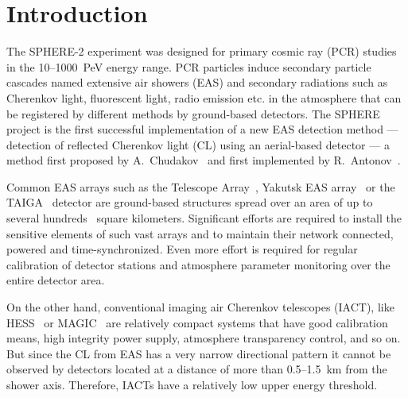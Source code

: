 \documentclass[universe,article,submit,moreauthors,pdftex]{Definitions/mdpi}
\begin{document}




\section{Introduction}
The SPHERE-2 experiment was designed for primary cosmic ray (PCR) studies in the 10--1000~PeV energy range. PCR particles induce secondary particle cascades named extensive air showers (EAS) and secondary radiations such as Cherenkov light, fluorescent light, radio emission etc. in the atmosphere that can be registered by different methods by ground-based detectors. 
The SPHERE project is the first successful implementation of a new EAS detection method --- detection of reflected Cherenkov light (CL) using an aerial-based detector --- a method first proposed by A.~Chudakov~\cite{chu74:VKKL74} and first implemented by R.~Antonov~\cite{ant75, ant86, ant97, Ant15a}.

Common EAS arrays such as the Telescope Array~\cite{abu12}, Yakutsk EAS array~\cite{Yakutsk19} or the TAIGA~\cite{TAIGA20} detector are ground-based structures spread over an area of up to several hundreds~\cite{abu12} square kilometers. Significant efforts are required to install the sensitive elements of such vast arrays and to maintain their network connected, powered and time-synchronized. Even more effort is required for regular calibration of detector stations and atmosphere parameter monitoring over the entire detector area. 

On the other hand, conventional imaging air Cherenkov telescopes (IACT), like HESS~\cite{HESS03a, HESS03b} or MAGIC~\cite{MAGIC16-1, MAGIC16-2} are relatively compact systems that have good calibration means, high integrity power supply, atmosphere transparency control, and so on. But since the CL from EAS has a very narrow directional pattern it cannot be observed by detectors located at a distance of more than 0.5--1.5~km from the shower axis. Therefore, IACTs have a relatively low upper energy threshold.
\end{document}
